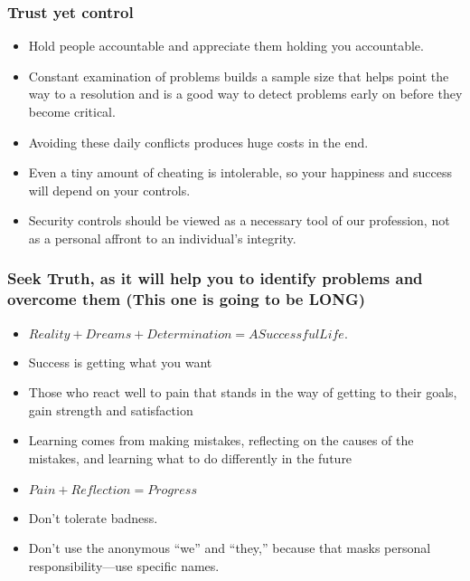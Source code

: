 \begin{frame}[fragile]\frametitle{Trust yet control}

\begin{itemize}
\item Hold people accountable and appreciate them holding you accountable.
\item Constant examination of problems builds a sample size that helps point the way to a resolution and is a good way to detect problems early on before they become critical. 
\item Avoiding these daily conflicts produces huge costs in the end.
\item Even a tiny amount of cheating is intolerable, so your happiness and success will depend on your controls. 
\item Security controls should be viewed as a necessary tool of our profession, not as a personal affront to an individual’s integrity. 
\end{itemize}

\end{frame}

\begin{frame}[fragile]\frametitle{Seek Truth, as it will help you to identify problems and overcome them (This one is going to be LONG)}

\begin{itemize}
\item $Reality + Dreams + Determination = A Successful Life.$
\item Success is getting what you want
\item Those who react well to pain that stands in the way of getting to their goals, gain strength and satisfaction
\item Learning comes from making mistakes, reflecting on the causes of the mistakes, and learning what to do differently in the future
\item $Pain + Reflection = Progress$
\item Don’t tolerate badness.
\item Don’t use the anonymous “we” and “they,” because that masks personal responsibility—use specific names.
\end{itemize}

\end{frame}




